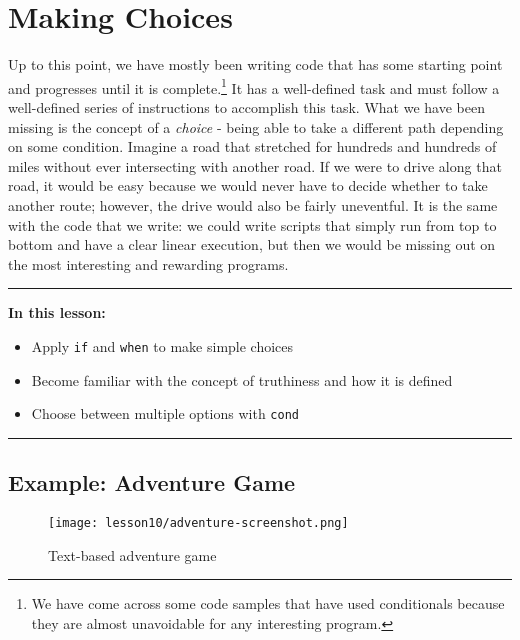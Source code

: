 \documentclass[10pt,twoside,openright]{memoir}
\begin{document}
\chapter{Making Choices}

Up to this point, we have mostly been writing code that has some
starting point and progresses until it is complete.\footnote{We have
  come across some code samples that have used conditionals because they
  are almost unavoidable for any interesting program.} It has a
well-defined task and must follow a well-defined series of instructions
to accomplish this task. What we have been missing is the concept of a
\emph{choice} - being able to take a different path depending on some
condition. Imagine a road that stretched for hundreds and hundreds of
miles without ever intersecting with another road. If we were to drive
along that road, it would be easy because we would never have to decide
whether to take another route; however, the drive would also be fairly
uneventful. It is the same with the code that we write: we could write
scripts that simply run from top to bottom and have a clear linear
execution, but then we would be missing out on the most interesting and
rewarding programs.

\begin{center}\rule{0.5\linewidth}{0.5pt}\end{center}

\textbf{In this lesson:}

\begin{itemize}
\tightlist
\item
  Apply \texttt{if} and \texttt{when} to make simple choices
\item
  Become familiar with the concept of truthiness and how it is defined
\item
  Choose between multiple options with \texttt{cond}
\end{itemize}

\begin{center}\rule{0.5\linewidth}{0.5pt}\end{center}


\section{Example: Adventure Game}

\begin{figure}[H]
\caption{Text-based adventure game}
\centering
\texttt{[image: lesson10/adventure-screenshot.png]}
\end{figure}
\end{document}
